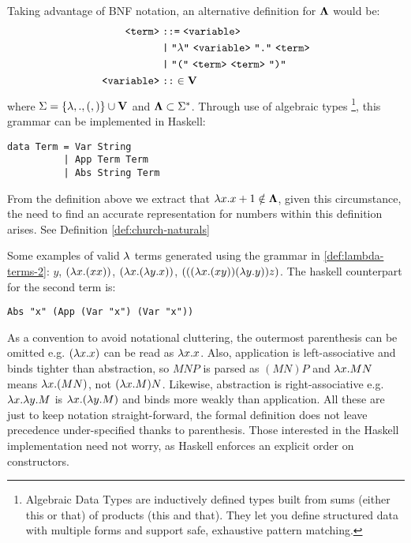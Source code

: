 \documentclass[12pt]{book}
\begin{document}
\begin{definition} Taking advantage of BNF notation, an alternative definition for $\mathbf{\Lambda}$ would be:
  \label{def:lambda-terms-2}
  \begin{align*}
    \texttt{<term>} &\;\texttt{::=}\; \texttt{<variable>} \\
                    &\;\texttt{|}\; \texttt{"$\la$"}\ \texttt{<variable>}\ \texttt{"."}\ \texttt{<term>} \\
                    &\;\texttt{|}\; \texttt{"("}\ \texttt{<term>}\ \texttt{<term>}\ \texttt{")"} \\
    \texttt{<variable>} &\;\texttt{::}\in \Vset
  \end{align*}
  where \( \Sigma = \{ \lambda, ., (, )\} \cup \mathbf{V} \) and \( \mathbf{\Lambda} \subset \Sigma^* \). Through use of algebraic types \footnote{Algebraic Data Types are inductively defined types built from sums (either this or that) of products (this and that). They let you define structured data with multiple forms and support safe, exhaustive pattern matching. }, this grammar can be implemented in Haskell:
  \begin{lstlisting}[style=haskellstyle,caption={Grammar implementation of the \lcalc \ language using Haskell's algebraic types}]
data Term = Var String
          | App Term Term
          | Abs String Term
\end{lstlisting}

\end{definition}
\begin{remark}
  From the definition above we extract that \( \lambda x . x + 1 \notin \mathbf{\Lambda} \), given this circumstance, the need to find an accurate representation for numbers within this definition arises. See Definition \ref{def:church-naturals}
\end{remark}
\begin{example} \label{ex:lambda-terms} Some examples of valid $\lambda$ terms generated using the grammar in \ref{def:lambda-terms-2}:
  \( y \),
  \( (\lambda x. (x x)) \),
  \( (\lambda x. (\lambda y. x)) \),
  \( (((\lambda x. (x y)) (\lambda y. y)) z) \).
  The haskell counterpart for the second term is:
  \begin{lstlisting}[style=haskellstyle,caption={Haskell interpretation of the second term}]
Abs "x" (App (Var "x") (Var "x"))
  \end{lstlisting}
\end{example}
As a convention to avoid notational cluttering, the outermost parenthesis can be omitted e.g. $ ( \lambda x.x ) $ can be read as $ \lambda x.x $. Also, application is left-associative  and binds tighter than abstraction, so $M N P$ is parsed as $(M N) P$ and $\lambda x . M N$ means $\lambda x . (M N)$, not $(\lambda x . M) N$. Likewise, abstraction is right-associative e.g. $\lambda x . \lambda y . M$ is $\lambda x . (\lambda y . M)$ and binds more weakly than application. All these are just to keep notation straight-forward, the formal definition does not leave precedence under-specified thanks to parenthesis. Those interested in the Haskell implementation need not worry, as Haskell enforces an explicit order on constructors.
\end{document}
